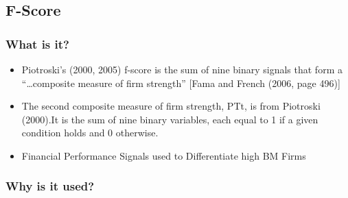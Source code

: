 \documentclass[12pt]{article}
\begin{document}
\subsection{F-Score}

    \subsubsection{What is it?}

        \begin{itemize}

            \item Piotroski’s (2000, 2005) f-score is the sum of nine binary signals that form a “…composite measure of firm strength” [Fama and French (2006, page 496)] \citep{Choi2012}

            \item The second composite measure of firm strength, PTt, is from Piotroski (2000).It
            is the sum of nine binary variables, each equal to 1 if a given condition holds and 0 otherwise.\citep{Fama2006}

            \item Financial Performance Signals used to Differentiate high BM Firms \citep{Piotroski2000}
        
        
        \end{itemize}

    \subsubsection{Why is it used?}
\end{document}
